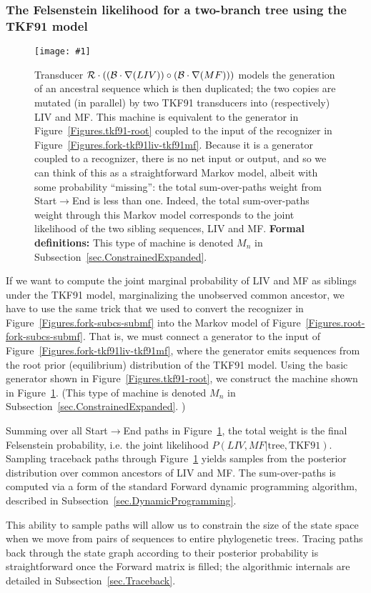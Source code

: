 \documentclass{article}
\newcommand{\secref}[1]{Subsection~\ref{sec.#1}}
\newcommand{\figref}[1]{Figure~\ref{Figures.#1}}
\newcommand{\figlabel}[1]{\label{Figures.#1}}
\newcommand{\easyfig}[4]{
\begin{figure}
\texttt{[image: \#1]}
\caption{ \figlabel{#3} #4}
\end{figure}}
\newcommand{\widepngfig}[2]{\easyfig{#1.png}{width=\textwidth}{#1}{#2}}
\newcommand\tkf{{\cal B}}
\newcommand\tkfroot{{\cal R}}
\newcommand\formaldefs{{\bf Formal definitions: }}
\newcommand\fork{\circ}
\newcommand\recognize{\nabla}
\begin{document}
\subsubsection{The Felsenstein likelihood for a two-branch tree using the TKF91 model}

\widepngfig{root-fork-tkf91liv-tkf91mf}{Transducer $\tkfroot \cdot ((\tkf \cdot \recognize(LIV))\fork(\tkf \cdot \recognize(MF)))$ models the generation of an ancestral sequence
which is then duplicated; the two copies are mutated (in parallel) by two TKF91 transducers into (respectively) LIV and MF.  
This machine is equivalent to the generator in \figref{tkf91-root} coupled to the input of the recognizer in \figref{fork-tkf91liv-tkf91mf}.
Because it is a generator coupled to a recognizer,
there is no net input or output, and so we can think of this as a straightforward Markov model,
albeit with some probability ``missing'': the total sum-over-paths weight from Start$\to$End is less than one.
Indeed, the total sum-over-paths weight through this Markov model
corresponds to the joint likelihood of the two sibling sequences, LIV and MF.
\formaldefs
This type of machine is denoted $M_n$ in \secref{ConstrainedExpanded}.  
}

If we want to compute the joint marginal probability of LIV and MF as siblings under the TKF91 model, marginalizing the unobserved common ancestor,
we have to use the same trick that we used to convert the recognizer in \figref{fork-subcs-submf} into the Markov model of \figref{root-fork-subcs-submf}.
That is, we must connect a generator to the input of \figref{fork-tkf91liv-tkf91mf},
where the generator emits sequences from the root prior (equilibrium) distribution of the TKF91 model.
Using the basic generator shown in \figref{tkf91-root}, we construct the machine shown
in \figref{root-fork-tkf91liv-tkf91mf}.  
(This type of machine is denoted $M_n$ in \secref{ConstrainedExpanded}.  )

Summing over all Start$\to$End paths in \figref{root-fork-tkf91liv-tkf91mf},
the total weight is the final Felsenstein probability, i.e. the joint likelihood $P(LIV,MF|\mbox{tree},\mbox{TKF91})$.
Sampling traceback paths through \figref{root-fork-tkf91liv-tkf91mf} yields samples from the  posterior distribution 
over common ancestors of LIV and MF.  
The sum-over-paths is computed via a form of the standard Forward dynamic programming
algorithm, described in \secref{DynamicProgramming}.  

This ability to sample paths will allow us to constrain
the size of the state space when we move from  pairs of 
sequences to entire phylogenetic trees.  
Tracing paths back through the state graph according to their posterior probability
is straightforward once the Forward matrix is filled; 
the algorithmic internals are detailed in \secref{Traceback}. 
\end{document}
